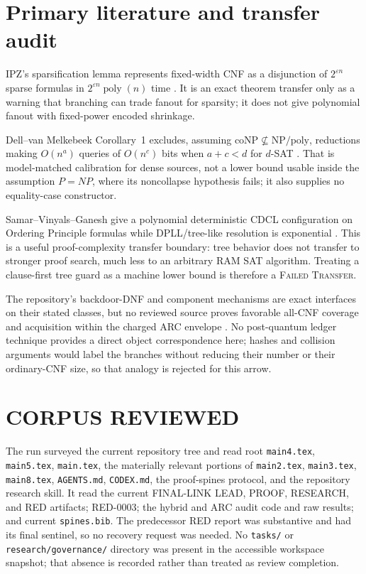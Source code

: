 \documentclass[11pt]{article}
\newcommand{\poly}{\operatorname{poly}}
\begin{document}
\section*{Primary literature and transfer audit}
IPZ's sparsification lemma represents fixed-width CNF as a disjunction of
$2^{\varepsilon n}$ sparse formulas in $2^{\varepsilon n}\poly(n)$ time
\cite{ipz2001}.  It is an exact theorem transfer only as a warning that
branching can trade fanout for sparsity; it does not give polynomial fanout
with fixed-power encoded shrinkage.

Dell--van Melkebeek Corollary~1 excludes, assuming
$\mathrm{coNP}\nsubseteq\mathrm{NP}/\mathrm{poly}$, reductions making
$O(n^a)$ queries of $O(n^c)$ bits when $a+c<d$ for $d$-SAT
\cite{dellvanmelkebeek2014}.  That is model-matched calibration for dense
sources, not a lower bound usable inside the assumption $P=NP$, where its
noncollapse hypothesis fails; it also supplies no equality-case constructor.

Samar--Vinyals--Ganesh give a polynomial deterministic CDCL configuration on
Ordering Principle formulas while DPLL/tree-like resolution is exponential
\cite{samar2026cdcl}.  This is a useful proof-complexity transfer boundary:
tree behavior does not transfer to stronger proof search, much less to an
arbitrary RAM SAT algorithm.  Treating a clause-first tree guard as a machine
lower bound is therefore a \textsc{Failed Transfer}.

The repository's backdoor-DNF and component mechanisms are exact interfaces
on their stated classes, but no reviewed source proves favorable all-CNF
coverage and acquisition within the charged ARC envelope
\cite{ordyniak2021bdnf}.  No post-quantum ledger technique provides a direct
object correspondence here; hashes and collision arguments would label the
branches without reducing their number or their ordinary-CNF size, so that
analogy is rejected for this arrow.

\section*{CORPUS REVIEWED}
The run surveyed the current repository tree and read root \texttt{main4.tex},
\texttt{main5.tex}, \texttt{main.tex}, the materially relevant portions of
\texttt{main2.tex}, \texttt{main3.tex}, \texttt{main8.tex},
\texttt{AGENTS.md}, \texttt{CODEX.md}, the proof-spines protocol, and the
repository research skill.  It read the current FINAL-LINK LEAD, PROOF,
RESEARCH, and RED artifacts; RED-0003; the hybrid and ARC audit code and raw
results; and current \texttt{spines.bib}.  The predecessor RED report was
substantive and had its final sentinel, so no recovery request was needed.
No \texttt{tasks/} or \texttt{research/governance/} directory was present in
the accessible workspace snapshot; that absence is recorded rather than
treated as review completion.
\end{document}
